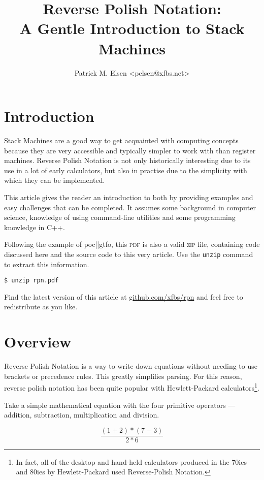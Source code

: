 \documentclass[a4paper,twocolumn]{article}
\title{Reverse Polish Notation:\\A Gentle Introduction to Stack Machines}
\author{Patrick M. Elsen <pelsen@xfbs.net>}
\date{}
\begin{document}
\maketitle
\tableofcontents

\section*{Introduction}

Stack Machines are a good way to get acquainted with computing concepts because they are very accessible and typically simpler to work with than register machines. Reverse Polish Notation is not only historically interesting due to its use in a lot of early calculators, but also in practise due to the simplicity with which they can be implemented.

This article gives the reader an introduction to both by providing examples and easy challenges that can be completed. It assumes some background in computer science, knowledge of using command-line utilities and some programming knowledge in C++.

Following the example of  poc||gtfo, this \textsc{pdf} is also a valid \textsc{zip} file, containing code discussed here and the source code to this very article. Use the \verb|unzip| command to extract this information.

\begin{verbatim}
$ unzip rpn.pdf
\end{verbatim}
Find the latest version of this article at \href{https://github.com/xfbs/rpn}{github.com/xfbs/rpn} and feel free to redistribute as you like.

\section{Overview}

Reverse Polish Notation is a way to write down equations without needing to use brackets or precedence rules. This greatly simplifies parsing. For this reason, reverse polish notation has been quite popular with  Hewlett-Packard calculators\footnote{In fact, all of the desktop and hand-held calculators produced in the 70ies and 80ies by  Hewlett-Packard used Reverse-Polish Notation.}.

Take a simple mathematical equation with the four primitive operators — addition, subtraction, multiplication and division.

\begin{equation}\label{eqn:simpleeqn}
  \frac{(1 + 2) * (7 - 3)}{2 * 6}
\end{equation}
\end{document}
